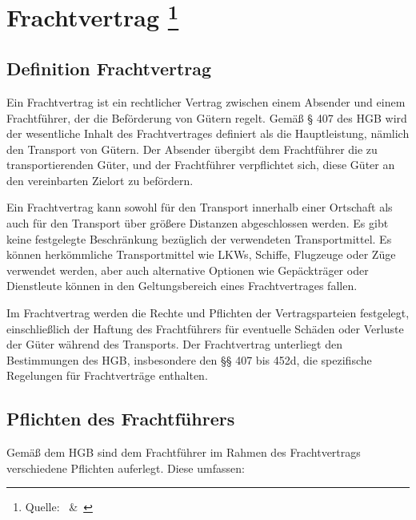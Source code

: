 \chapter[Frachtvertrag]{Frachtvertrag \footnote{Quelle:~\cite{Handelsrecht} \&~\cite{frachtvertrag}}}

\section[Definition]{Definition Frachtvertrag}

Ein Frachtvertrag ist ein rechtlicher Vertrag zwischen einem Absender und einem Frachtführer, der die Beförderung von Gütern regelt. Gemäß § 407 des \ac{HGB} wird der wesentliche Inhalt des Frachtvertrages definiert als die Hauptleistung, nämlich den Transport von Gütern. Der Absender übergibt dem Frachtführer die zu transportierenden Güter, und der Frachtführer verpflichtet sich, diese Güter an den vereinbarten Zielort zu befördern.

Ein Frachtvertrag kann sowohl für den Transport innerhalb einer Ortschaft als auch für den Transport über größere Distanzen abgeschlossen werden. Es gibt keine festgelegte Beschränkung bezüglich der verwendeten Transportmittel. Es können herkömmliche Transportmittel wie LKWs, Schiffe, Flugzeuge oder Züge verwendet werden, aber auch alternative Optionen wie Gepäckträger oder Dienstleute können in den Geltungsbereich eines Frachtvertrages fallen.

Im Frachtvertrag werden die Rechte und Pflichten der Vertragsparteien festgelegt, einschließlich der Haftung des Frachtführers für eventuelle Schäden oder Verluste der Güter während des Transports. Der Frachtvertrag unterliegt den Bestimmungen des \ac{HGB}, insbesondere den §§ 407 bis 452d, die spezifische Regelungen für Frachtverträge enthalten.

\section{Pflichten des Frachtführers}

Gemäß dem HGB sind dem Frachtführer im Rahmen des Frachtvertrags verschiedene Pflichten auferlegt. Diese umfassen:

